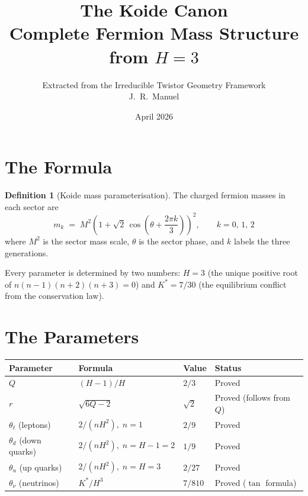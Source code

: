 \documentclass[11pt,a4paper]{article}
\title{The Koide Canon\\[6pt]\large Complete Fermion Mass Structure from $H=3$}
\author{Extracted from the Irreducible Twistor Geometry Framework\\J.~R.~Manuel}
\date{April 2026}
\theoremstyle{definition}
\newtheorem{definition}[theorem]{Definition}
\theoremstyle{remark}
\begin{document}
\maketitle

\section*{The Formula}

\begin{definition}[Koide mass parameterisation]
The charged fermion masses in each sector are
\begin{equation}\label{eq:koide}
\boxed{\;m_k \;=\; M^2 \left(1 + \sqrt{2}\,\cos\!\left(\theta + \frac{2\pi k}{3}\right)\right)^{\!2},\qquad k = 0,\,1,\,2\;}
\end{equation}
where $M^2$ is the sector mass scale, $\theta$ is the sector phase, and $k$ labels the three generations.
\end{definition}

Every parameter is determined by two numbers: $H=3$ (the unique positive root of $n(n\!-\!1)(n\!+\!2)(n\!+\!3)=0$) and $K^*=7/30$ (the equilibrium conflict from the conservation law).

\bigskip

\section*{The Parameters}

\renewcommand{\arraystretch}{1.4}
\begin{center}
\begin{tabular}{@{}llll@{}}
\toprule
\textbf{Parameter} & \textbf{Formula} & \textbf{Value} & \textbf{Status} \\
\midrule
$Q$ & $(H\!-\!1)/H$ & $2/3$ & Proved \\
$r$ & $\sqrt{6Q-2}$ & $\sqrt{2}$ & Proved (follows from $Q$) \\
$\theta_\ell$ (leptons) & $2/(nH^2),\; n\!=\!1$ & $2/9$ & Proved \\
$\theta_d$ (down quarks) & $2/(nH^2),\; n\!=\!H\!-\!1\!=\!2$ & $1/9$ & Proved \\
$\theta_u$ (up quarks) & $2/(nH^2),\; n\!=\!H\!=\!3$ & $2/27$ & Proved \\
$\theta_\nu$ (neutrinos) & $K^*/H^3$ & $7/810$ & Proved ($\tan$ formula) \\
\bottomrule
\end{tabular}
\end{center}
\end{document}
